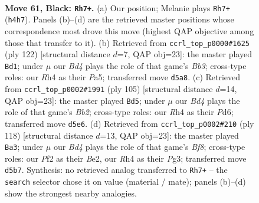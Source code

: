 \documentclass[11pt]{article}
\begin{document}
\clearpage

\begin{figure}[p]\centering
\begin{subfigure}{0.46\textwidth}\centering
\resizebox{\linewidth}{!}{%
\newchessgame
\chessboard[
  setfen={8/P3P1K1/5N2/2kb4/7r/8/5p2/8 b - - 4 61},
  showmover=false,
  pgfstyle=straightmove, color=movearrow, markmove={h4-h7}
]}
\caption{}
\end{subfigure}\hfill
\begin{subfigure}{0.46\textwidth}\centering
\resizebox{\linewidth}{!}{%
\newchessgame
\chessboard[
  setfen={8/1p4p1/8/P1k5/3n1K1P/1B6/8/8 w - - 2 62},
  showmover=false,
  pgfstyle=straightmove, color=movearrow, markmove={b3-d1}
]}
\caption{}
\end{subfigure}
\\[4pt]
\begin{subfigure}{0.46\textwidth}\centering
\resizebox{\linewidth}{!}{%
\newchessgame
\chessboard[
  setfen={3k4/1b6/1P1p4/NK6/8/8/8/8 b - - 8 53},
  showmover=false,
  pgfstyle=straightmove, color=movearrow, markmove={b7-d5}
]}
\caption{}
\end{subfigure}\hfill
\begin{subfigure}{0.46\textwidth}\centering
\resizebox{\linewidth}{!}{%
\newchessgame
\chessboard[
  setfen={5B2/8/5kn1/b6p/4K3/6P1/4B3/8 w - - 2 60},
  showmover=false,
  pgfstyle=straightmove, color=movearrow, markmove={f8-a3}
]}
\caption{}
\end{subfigure}
\caption{\textbf{Move 61, Black: \texttt{Rh7+}.} (a) Our position; Melanie plays \texttt{Rh7+} (\texttt{h4h7}). Panels (b)--(d) are the retrieved master positions whose correspondence most drove this move (highest QAP objective among those that transfer to it). (b) Retrieved from \texttt{ccrl\_top\_p0000\#1625} (ply 122) [structural distance $d$=7, QAP obj=23]: the master played \texttt{Bd1}; under $\mu$ our \emph{Bd4} plays the role of that game's \emph{Bb3}; cross-type roles: our \emph{R}h4 as their \emph{P}a5; transferred move \texttt{d5a8}. (c) Retrieved from \texttt{ccrl\_top\_p0002\#1991} (ply 105) [structural distance $d$=14, QAP obj=23]: the master played \texttt{Bd5}; under $\mu$ our \emph{Bd4} plays the role of that game's \emph{Bb2}; cross-type roles: our \emph{R}h4 as their \emph{P}d6; transferred move \texttt{d5e6}. (d) Retrieved from \texttt{ccrl\_top\_p0002\#210} (ply 118) [structural distance $d$=13, QAP obj=23]: the master played \texttt{Ba3}; under $\mu$ our \emph{Bd4} plays the role of that game's \emph{Bf8}; cross-type roles: our \emph{P}f2 as their \emph{B}e2, our \emph{R}h4 as their \emph{P}g3; transferred move \texttt{d5b7}. Synthesis: no retrieved analog transferred to \texttt{Rh7+} -- the \texttt{search} selector chose it on value (material / mate); panels (b)--(d) show the strongest nearby analogies.}
\label{fig:thought-m121}
\end{figure}
\end{document}
